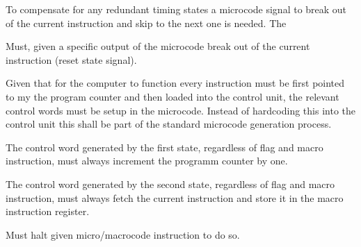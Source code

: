 To compensate for any redundant timing states a microcode signal to break out of the current instruction and skip to the next one is needed. The 

\begin{feat-requirement}
  Must, given a specific output of the microcode break out of the current instruction (reset state signal).
\end{feat-requirement}


Given that for the computer to function every instruction must be first pointed to my the program counter and then loaded into the control unit, the relevant control words must be setup in the microcode. Instead of hardcoding this into the control unit this shall be part of the standard microcode generation process.
\begin{feat-requirement}
  The control word generated by the first state, regardless of flag and macro instruction, must always increment the programm counter by one. 
\end{feat-requirement}

\begin{feat-requirement}
  The control word generated by the second state, regardless of flag and macro instruction, must always fetch the current instruction and store it in the macro instruction register.
\end{feat-requirement}


\begin{feat-requirement}
  Must halt given micro/macrocode instruction to do so. 
\end{feat-requirement}

